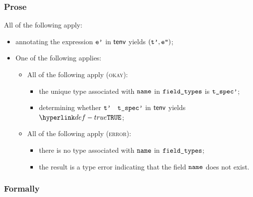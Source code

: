 \subsubsection{Prose}
All of the following apply:
\begin{itemize}
  \item annotating the expression $\texttt{e'}$ in $\textsf{tenv}$ yields $(\texttt{t'}, \texttt{e''})$\ProseOrTypeError;
  \item One of the following applies:
  \begin{itemize}
    \item All of the following apply (\textsc{okay}):
    \begin{itemize}
      \item the unique type associated with $\texttt{name}$ in $\texttt{field\_types}$ is $\texttt{t\_spec'}$;
      \item determining whether $\texttt{t'}$ \typesatisfies\ $\texttt{t\_spec'}$ in $\textsf{tenv}$ yields $\True$\ProseOrTypeError;
    \end{itemize}

    \item All of the following apply (\textsc{error}):
    \begin{itemize}
      \item there is no type associated with $\texttt{name}$ in $\texttt{field\_types}$;
      \item the result is a type error indicating that the field $\texttt{name}$ does not exist.
    \end{itemize}
  \end{itemize}
\end{itemize}

\subsubsection{Formally}

